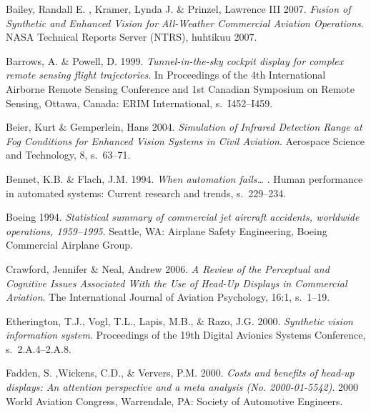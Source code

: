 \documentclass[utf8,bachelor,manualbib]{gradu3}
\begin{document}
\begin{thebibliography}{}

Bailey, Randall E. , Kramer, Lynda J. \& Prinzel, Lawrence III 2007.
\textit{Fusion of Synthetic and Enhanced Vision for All-Weather Commercial Aviation Operations}.
NASA Technical Reports Server (NTRS), huhtikuu 2007.

Barrows, A. \& Powell, D. 1999.
\textit{Tunnel-in-the-sky cockpit display for complex remote sensing flight
trajectories}.
In Proceedings of the 4th International Airborne Remote Sensing Conference and 1st
Canadian Symposium on Remote Sensing, Ottawa, Canada: ERIM International, s.~I452--I459.

Beier, Kurt \& Gemperlein, Hans 2004.
\textit{Simulation of Infrared Detection Range at Fog Conditions for Enhanced Vision Systems in Civil Aviation}.
Aerospace Science and Technology, 8, s.~63--71.

Bennet, K.B. \& Flach, J.M. 1994.
\textit{When automation fails… }.
Human performance in automated systems: Current research and trends, s.~229--234.

Boeing 1994.
\textit{Statistical summary of commercial jet aircraft accidents, worldwide operations, 1959–1995}.
Seattle, WA: Airplane Safety Engineering, Boeing Commercial Airplane Group.

Crawford, Jennifer \& Neal, Andrew 2006.
\textit{A Review of the Perceptual and Cognitive Issues Associated With the Use of Head-Up Displays in Commercial Aviation}.
The International Journal of Aviation Psychology, 16:1, s.~1--19.

Etherington, T.J., Vogl, T.L., Lapis, M.B., \& Razo, J.G. 2000.
\textit{Synthetic vision information system}.
Proceedings of the 19th Digital Avionics Systems Conference, s.~2.A.4--2.A.8.

Fadden, S. ,Wickens, C.D., \& Ververs, P.M. 2000.
\textit{Costs and benefits of head-up displays: An attention
perspective and a meta analysis (No. 2000-01-5542)}.
2000 World Aviation Congress, Warrendale, PA: Society of Automotive Engineers.


\end{thebibliography}
\end{document}
